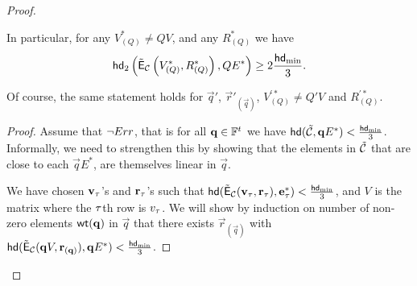 \begin{proof}
\begin{lemma}
In particular, for any $V_{(Q)}^*\neq QV$, and any $R_{(Q)}^*$ we have 
\[ \mathsf{hd}_2\left(\tilde{\mathsf{E}}_{\mathcal{C}}\left(V_{(Q)}^*,R_{(Q)}^*\right),QE^*\right)\geq 2\frac{\mathsf{hd}_{\mathrm{min}}}{3}.\]
\end{lemma}

Of course, the same statement holds for $\vec{q}'$, $\vec{r}'_{(\vec{q})}$, $V_{(Q)}^{'*}\neq Q'V$ and $R_{(Q)}^{'*}$.

\begin{proof}
Assume that $\neg Err$, that is for all $\mathbf{q}\in \mathbb{F}^{{t_{}}}$ we have $\mathsf{hd}(\tilde{\mathcal{C}}, \mathbf{q} E^*)< \frac{\mathsf{hd}_{\mathrm{min}}}{3}$. Informally, we need to strengthen this by showing that the elements in $\tilde{\mathcal{C}}$ that are close to each $\vec{q} E^*$, are themselves linear in $\vec{q}$. 


We have chosen ${\mathbf{v}}_\tau$'s and $\mathbf{r}_\tau$'s such that $\mathsf{hd}(\tilde{\mathsf{E}}_{\mathcal{C}}({\mathbf{v}}_\tau,\mathbf{r}_\tau),\mathbf{e}^*_\tau)<\frac{\mathsf{hd}_{\mathrm{min}}}{3}$, and $V$ is the matrix where the $\tau$th row is $v_\tau$. We will show by induction on number of non-zero elements $\mathsf{wt}(\mathbf{q})$ in $\vec{q}$ that there exists $\vec{r}_{(\vec{q})}$ with $\mathsf{hd}(\tilde{\mathsf{E}}_{\mathcal{C}}(\mathbf{q} V, \mathbf{r}_{(\mathbf{q})}), \mathbf{q} E^*)< \frac{\mathsf{hd}_{\mathrm{min}}}{3}$. 



\end{proof}
\end{proof}

